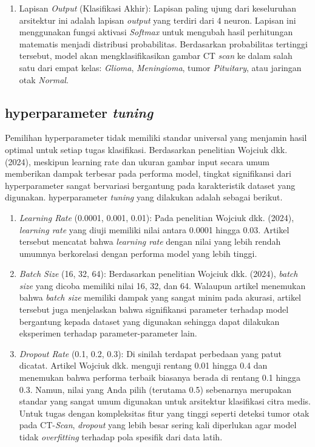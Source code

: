 \begin{enumerate}
	\item Lapisan \textit{Output} (Klasifikasi Akhir):
	Lapisan paling ujung dari keseluruhan arsitektur ini adalah lapisan \textit{output} yang terdiri dari 4 neuron. Lapisan ini menggunakan fungsi aktivasi \textit{Softmax} untuk mengubah hasil perhitungan matematis menjadi distribusi probabilitas. Berdasarkan probabilitas tertinggi tersebut, model akan mengklasifikasikan gambar CT \textit{scan} ke dalam salah satu dari empat kelas: \textit{Glioma}, \textit{Meningioma}, tumor \textit{Pituitary}, atau jaringan otak \textit{Normal}.
\end{enumerate}

\subsection{hyperparameter \textit{tuning}}
Pemilihan hyperparameter tidak memiliki standar universal yang menjamin hasil optimal untuk setiap tugas klasifikasi. Berdasarkan penelitian Wojciuk dkk. (2024), meskipun learning rate dan ukuran gambar input secara umum memberikan dampak terbesar pada performa model, tingkat signifikansi dari hyperparameter sangat bervariasi bergantung pada karakteristik dataset yang digunakan. hyperparameter \textit{tuning} yang dilakukan adalah sebagai berikut.
\begin{enumerate}
	\item \textit{Learning Rate} (0.0001, 0.001, 0.01):
	Pada penelitian Wojciuk dkk. (2024), \textit{learning rate} yang diuji memiliki nilai antara 0.0001 hingga 0.03. Artikel tersebut mencatat bahwa \textit{learning rate} dengan nilai yang lebih rendah umumnya berkorelasi dengan performa model yang lebih tinggi.
	
	\item \textit{Batch Size} (16, 32, 64):
	Berdasarkan penelitian Wojciuk dkk. (2024), \textit{batch size} yang dicoba memiliki nilai 16, 32, dan 64. Walaupun artikel menemukan bahwa \textit{batch size} memiliki dampak yang sangat minim pada akurasi, artikel tersebut juga menjelaskan bahwa signifikansi parameter terhadap model bergantung kepada dataset yang digunakan sehingga dapat dilakukan eksperimen terhadap parameter-parameter lain.
	
	\item \textit{Dropout Rate} (0.1, 0.2, 0.3):
	Di sinilah terdapat perbedaan yang patut dicatat. Artikel Wojciuk dkk. menguji rentang 0.01 hingga 0.4 dan menemukan bahwa performa terbaik biasanya berada di rentang 0.1 hingga 0.3. Namun, nilai yang Anda pilih (terutama 0.5) sebenarnya merupakan standar yang sangat umum digunakan untuk arsitektur klasifikasi citra medis. Untuk tugas dengan kompleksitas fitur yang tinggi seperti deteksi tumor otak pada CT-\textit{Scan}, \textit{dropout} yang lebih besar sering kali diperlukan agar model tidak \textit{overfitting} terhadap pola spesifik dari data latih. 
\end{enumerate}

